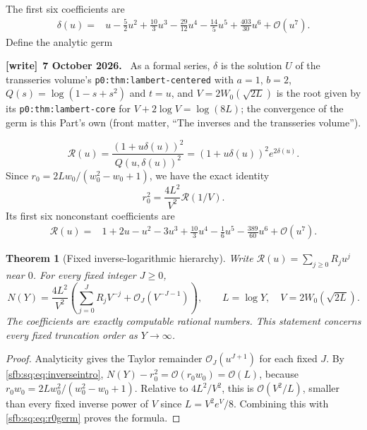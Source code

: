 \documentclass[11pt]{article}
\newtheorem{theorem}{Theorem}[section]
\theoremstyle{remark}\newtheorem{remark}[theorem]{Remark}
\newcommand{\OO}{\mathcal O}
\newcommand{\file}[1]{\nolinkurl{#1}}
\newenvironment{writenote}[1][]{\par\smallskip\begingroup\small
 \noindent\textbf{[write]}\if\relax\detokenize{#1}\relax\else~\textbf{#1.}\fi\ }%
 {\par\endgroup\smallskip}
\begin{document}
The first six coefficients are
\begin{equation}\label{sfb:sq:eq:deltaseries}
 \begin{split}
 \delta(u)={}&u-\frac52u^2+\frac{10}{3}u^3-\frac{29}{12}u^4
             -\frac{14}{5}u^5+\frac{403}{30}u^6+\OO(u^7).
 \end{split}
\end{equation}
Define the analytic germ

\begin{writenote}[7 October 2026]
As a formal series, $\delta$ is the solution $U$ of the transseries volume's \file{p0:thm:lambert-centered} with $a=1$, $b=2$, $Q(s)=\log(1-s+s^2)$ and $t=u$, and $V=2W_0(\sqrt{2L})$ is the root given by its \file{p0:thm:lambert-core} for $V+2\log V=\log(8L)$; the convergence of the germ is this Part's own (front matter, ``The inverses and the transseries volume'').
\end{writenote}
\begin{equation}\label{sfb:sq:eq:Rgerm}
 \mathcal R(u)=\frac{(1+u\delta(u))^2}{Q(u,\delta(u))^2}
             =(1+u\delta(u))^2e^{2\delta(u)}.
\end{equation}
Since $r_0=2Lw_0/(w_0^2-w_0+1)$, we have the exact identity
\begin{equation}\label{sfb:sq:eq:r0germ}
 r_0^2=\frac{4L^2}{V^2}\mathcal R(1/V).
\end{equation}
Its first six nonconstant coefficients are
\begin{equation}\label{sfb:sq:eq:Rseries}
 \begin{split}
 \mathcal R(u)={}&1+2u-u^2-3u^3+\frac{10}{3}u^4
                 -\frac16u^5-\frac{389}{60}u^6+\OO(u^7).
 \end{split}
\end{equation}

\begin{theorem}[Fixed inverse-logarithmic hierarchy]\label{sfb:sq:thm:hierarchy}
Write $\mathcal R(u)=\sum_{j\ge0}R_ju^j$ near $0$. For every fixed integer $J\ge0$,
\begin{equation}\label{sfb:sq:eq:hierarchy}
 N(Y)=\frac{4L^2}{V^2}
 \left(\sum_{j=0}^J R_jV^{-j}+\OO_J(V^{-J-1})\right),
 \qquad L=\log Y,\quad V=2W_0(\sqrt{2L}).
\end{equation}
The coefficients are exactly computable rational numbers. This statement concerns every fixed truncation order as $Y\to\infty$.
\end{theorem}
\begin{proof}
Analyticity gives the Taylor remainder $\OO_J(u^{J+1})$ for each fixed $J$. By \eqref{sfb:sq:eq:inverseintro}, $N(Y)-r_0^2=\OO(r_0w_0)=\OO(L)$, because
$r_0w_0=2Lw_0^2/(w_0^2-w_0+1)$. Relative to $4L^2/V^2$, this is $\OO(V^2/L)$, smaller than every fixed inverse power of $V$ since $L=V^2e^V/8$. Combining this with \eqref{sfb:sq:eq:r0germ} proves the formula.
\end{proof}
\end{document}

